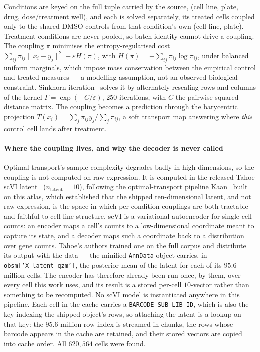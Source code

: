 Conditions are keyed on the full tuple carried by the source, (cell line, plate,
drug, dose/treatment well), and each is solved separately, its treated cells
coupled only to the shared DMSO controls from that condition's own (cell line,
plate). Treatment conditions are never pooled, so batch identity cannot drive a
coupling. The coupling $\pi$ minimises the entropy-regularised cost
$\sum_{ij}\pi_{ij}\lVert x_i - y_j\rVert^2-\varepsilon H(\pi)$, with
$H(\pi)=-\sum_{ij}\pi_{ij}\log\pi_{ij}$, under balanced uniform marginals,
which impose mass conservation between the
empirical control and treated measures --- a modelling assumption, not an observed
biological constraint. Sinkhorn iteration~\cite{cuturi} solves it by alternately
rescaling rows and columns of the kernel $\Gamma = \exp(-C/\varepsilon)$, $250$
iterations, with $C$ the pairwise squared-distance matrix. The coupling becomes a
prediction through the barycentric projection
$T(x_i) = \sum_j \pi_{ij} y_j \big/ \sum_j \pi_{ij}$, a soft transport map
answering where \emph{this} control cell lands after treatment.

\paragraph{Where the coupling lives, and why the decoder is never called}
Optimal transport's sample complexity degrades badly in high dimensions, so the
coupling is not computed on raw expression. It is computed in the released Tahoe scVI latent~\cite{scvi} ($n_{\textrm{latent}} = 10$), following the optimal-transport pipeline Kaan~\cite{mertkaan} built on this atlas, which established that the shipped ten-dimensional latent, and not raw expression, is the space in which per-condition couplings are both tractable and faithful to cell-line structure. scVI is a variational
autoencoder for single-cell counts: an encoder maps a cell's counts to a
low-dimensional coordinate meant to capture its state, and a decoder maps such a
coordinate back to a distribution over gene counts. Tahoe's authors trained one
on the full corpus and distribute its output with the data --- the minified
\texttt{AnnData} object carries, in \texttt{obsm['X\_latent\_qzm']}, the posterior
mean of the latent for each of its $95.6$ million cells. The encoder has therefore
already been run once, by them, over every cell this work uses, and its result is
a stored per-cell $10$-vector rather than something to be recomputed. No scVI
model is instantiated anywhere in this pipeline. Each cell in the cache carries a
\texttt{BARCODE\_SUB\_LIB\_ID}, which is also the key indexing the shipped object's
rows, so attaching the latent is a lookup on that key: the $95.6$-million-row index
is streamed in chunks, the rows whose barcode appears in the cache are retained,
and their stored vectors are copied into cache order. All $620{,}564$ cells were
found.

